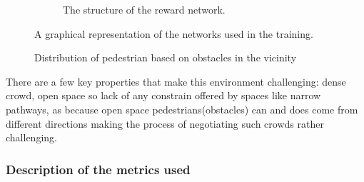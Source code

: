 \begin{figure}
\begin{subfigure}[b]{.5\textwidth}
    	\caption{The structure of the reward network.}
    	\label{fig:reward-network}
    \end{subfigure}%
\caption{A graphical representation of the networks used in the training.}
\end{figure}


\begin{figure}
    \caption {Distribution of pedestrian based on obstacles in the vicinity}
\end{figure}


There are a few key properties that make this environment challenging: dense crowd, open space so lack of any constrain offered by spaces like narrow pathways, as because open space pedestrians(obstacles) can and does come from different directions making the process of negotiating such crowds rather challenging. 

%            

\subsubsection*{Description of the metrics used}
%

